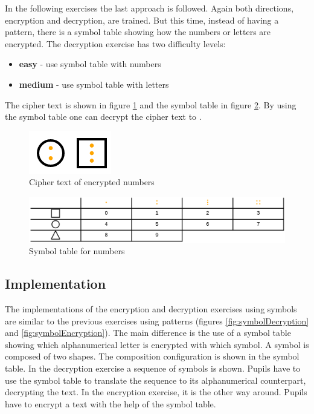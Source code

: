 In the following exercises the last approach is followed. Again both directions, encryption and decryption, are trained. But this time, instead of having a pattern, there is a symbol table showing how the numbers or letters are encrypted. The decryption exercise has two difficulty levels:

\begin{itemize}
    \item \textbf{easy} - use symbol table with numbers
    \item \textbf{medium} - use symbol table with letters
\end{itemize}

\begin{example}
    The cipher text is shown in figure \ref{fig:cipher_number} and the symbol table in figure \ref{fig:symboltable_numbers}. By using the symbol table one can decrypt the cipher text to .
\end{example}

\begin{figure}[h]
    \centering
    \includegraphics[width=0.15\columnwidth]{figures/cipher_number.png}
    \caption{Cipher text of encrypted numbers}
    \label{fig:cipher_number} 
\end{figure}
\begin{figure}[h]
    \centering
    \includegraphics[width=1.0\columnwidth]{figures/symboltable_numbers.png}
    \caption{Symbol table for numbers}
    \label{fig:symboltable_numbers} 
\end{figure}

\subsection{Implementation}

The implementations of the encryption and decryption exercises using symbols are similar to the previous exercises using patterns (figures \ref{fig:symbolDecryption} and \ref{fig:symbolEncryption}). The main difference is the use of a symbol table showing which alphanumerical letter is encrypted with which symbol. A symbol is composed of two shapes. The composition configuration is shown in the symbol table. In the decryption exercise a sequence of symbols is shown. Pupils have to use the symbol table to translate the sequence to its alphanumerical counterpart, decrypting the text. In the encryption exercise, it is the other way around. Pupils have to encrypt a text with the help of the symbol table.

